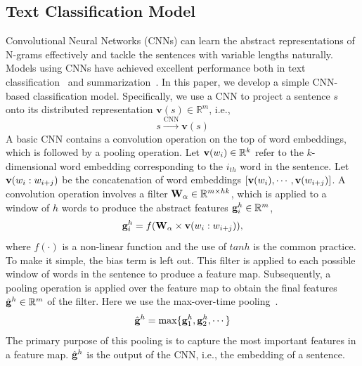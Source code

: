 \documentclass[letterpaper]{article}
\begin{document}
\subsection{Text Classification Model}
Convolutional Neural Networks (CNNs) can learn the abstract representations of N-grams effectively and tackle the sentences with variable lengths naturally.
Models using CNNs have achieved excellent performance both in text classification~\cite{lai2015recurrent} and summarization~\cite{yin2015optimizing}.
In this paper, we develop a simple CNN-based classification model.
Specifically, we use a CNN to project a sentence $s$ onto its distributed representation ${\mathbf{v}}(s) \in \mathbb{R}^m$, i.e.,
\begin{equation} \label{eq:sentenceEmbedding}
s\xrightarrow{{{\text{CNN}}}}{\mathbf{v}}(s)
\end{equation}
A basic CNN contains a convolution operation on the top of word embeddings, which is followed by a pooling operation.
Let ${\bf{v}}(w_i) \in \mathbb{R}^k$ refer to the $k$-dimensional word embedding corresponding to the $i_{th}$ word in the sentence.
Let ${\bf{v}}(w_i : w_{i+j})$ be the concatenation of word embeddings
$[{\bf{v}}(w_i),\cdots,{\bf{v}}(w_{i+j})]$.
A convolution operation involves a filter ${\bf{W}}_\alpha \in \mathbb{R}^{m \times hk}$, which is applied to a window of $h$ words to produce the abstract features ${\bf{g}}_i^h \in \mathbb{R}^m$,
\begin{equation}\label{EQ:filter}
{\bf{g}}_i^h = f({\bf{W}}_ \alpha \times {\bf{v}}(w_i : w_{i+j})),
\end{equation}
where $f(\cdot)$ is a non-linear function and  the use of $tanh$ is the common practice.
To make it simple, the bias term is left out.
This filter is applied to each possible window of words in the sentence to produce a feature map.
Subsequently, a pooling operation is applied over the feature map to obtain the final features $\hat{\bf{g}}^h \in \mathbb{R}^m$ of the filter.
Here we use the max-over-time pooling~\cite{Collobert2011}.
\begin{equation}
\hat{\bf{g}}^h=\max\{{\bf{g}}_1^h, {\bf{g}}_2^h,\cdots\}
\end{equation}
The primary purpose of this pooling is to capture the most important features in a feature map.
$\hat{\bf{g}}^h$ is the output of the CNN, i.e., the embedding of a sentence.
\end{document}
